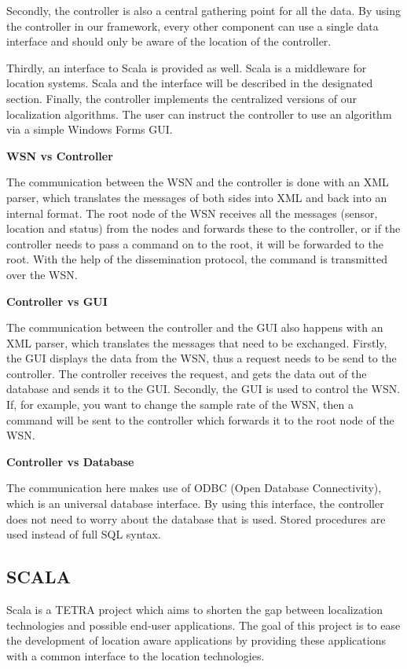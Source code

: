 Secondly, the controller is also a central gathering point for all the data. By using the controller in our framework, every other component can use a single data interface and should only be aware of the location of the controller.

Thirdly, an interface to Scala is provided as well. Scala is a middleware for location systems. Scala and the interface will be described in the designated section.
Finally, the controller implements the centralized versions of our localization algorithms. The user can instruct the controller to use an algorithm via a simple Windows Forms GUI.

\textbf{WSN vs Controller}

The communication between the WSN and the controller is done with an XML parser, which translates the messages of both sides into XML and back into an internal format. The root node of the WSN receives all the messages (sensor, location and status) from the nodes and forwards these to the controller, or if the controller needs to pass a command on to the root, it will be forwarded to the root. With the help of the dissemination protocol, the command is transmitted over the WSN. 

\textbf{Controller vs GUI}

The communication between the controller and the GUI also happens with an XML parser, which translates the messages that need to be exchanged. Firstly, the GUI displays the data from the WSN, thus a request needs to be send to the controller. The controller receives the request, and gets the data out of the database and sends it to the GUI. Secondly, the GUI is used to control the WSN. If, for example, you want to change the sample rate of the WSN, then a command will be sent to the controller which forwards it to the root node of the WSN. 

\textbf{Controller vs Database}

The communication here makes use of ODBC (Open Database Connectivity), which is an universal database interface. By using this interface, the controller does not need to worry about the database that is used. Stored procedures are used instead of full SQL syntax.

\subsection{SCALA}
Scala is a TETRA \cite{tetra} project which aims to shorten the gap between localization technologies and possible end-user applications. The goal of this project is to ease the development of location aware applications by providing these applications with a common interface to the location technologies.

